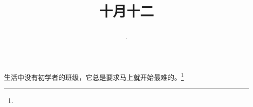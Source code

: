 \title{\date[d=12,m=11,y=2024][year:cn-y,年,month:cn,day:cn,日,·,weekday]·十月十二 }
生活中没有初学者的班级，它总是要求马上就开始最难的。\footnote{ }

